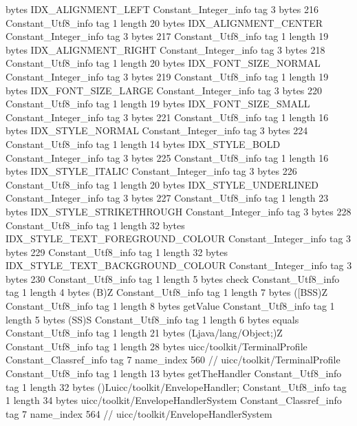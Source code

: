 {{{			bytes	IDX_ALIGNMENT_LEFT
		}
		Constant_Integer_info {
			tag	3
			bytes	216
		}
		Constant_Utf8_info {
			tag	1
			length	20
			bytes	IDX_ALIGNMENT_CENTER
		}
		Constant_Integer_info {
			tag	3
			bytes	217
		}
		Constant_Utf8_info {
			tag	1
			length	19
			bytes	IDX_ALIGNMENT_RIGHT
		}
		Constant_Integer_info {
			tag	3
			bytes	218
		}
		Constant_Utf8_info {
			tag	1
			length	20
			bytes	IDX_FONT_SIZE_NORMAL
		}
		Constant_Integer_info {
			tag	3
			bytes	219
		}
		Constant_Utf8_info {
			tag	1
			length	19
			bytes	IDX_FONT_SIZE_LARGE
		}
		Constant_Integer_info {
			tag	3
			bytes	220
		}
		Constant_Utf8_info {
			tag	1
			length	19
			bytes	IDX_FONT_SIZE_SMALL
		}
		Constant_Integer_info {
			tag	3
			bytes	221
		}
		Constant_Utf8_info {
			tag	1
			length	16
			bytes	IDX_STYLE_NORMAL
		}
		Constant_Integer_info {
			tag	3
			bytes	224
		}
		Constant_Utf8_info {
			tag	1
			length	14
			bytes	IDX_STYLE_BOLD
		}
		Constant_Integer_info {
			tag	3
			bytes	225
		}
		Constant_Utf8_info {
			tag	1
			length	16
			bytes	IDX_STYLE_ITALIC
		}
		Constant_Integer_info {
			tag	3
			bytes	226
		}
		Constant_Utf8_info {
			tag	1
			length	20
			bytes	IDX_STYLE_UNDERLINED
		}
		Constant_Integer_info {
			tag	3
			bytes	227
		}
		Constant_Utf8_info {
			tag	1
			length	23
			bytes	IDX_STYLE_STRIKETHROUGH
		}
		Constant_Integer_info {
			tag	3
			bytes	228
		}
		Constant_Utf8_info {
			tag	1
			length	32
			bytes	IDX_STYLE_TEXT_FOREGROUND_COLOUR
		}
		Constant_Integer_info {
			tag	3
			bytes	229
		}
		Constant_Utf8_info {
			tag	1
			length	32
			bytes	IDX_STYLE_TEXT_BACKGROUND_COLOUR
		}
		Constant_Integer_info {
			tag	3
			bytes	230
		}
		Constant_Utf8_info {
			tag	1
			length	5
			bytes	check
		}
		Constant_Utf8_info {
			tag	1
			length	4
			bytes	(B)Z
		}
		Constant_Utf8_info {
			tag	1
			length	7
			bytes	([BSS)Z
		}
		Constant_Utf8_info {
			tag	1
			length	8
			bytes	getValue
		}
		Constant_Utf8_info {
			tag	1
			length	5
			bytes	(SS)S
		}
		Constant_Utf8_info {
			tag	1
			length	6
			bytes	equals
		}
		Constant_Utf8_info {
			tag	1
			length	21
			bytes	(Ljava/lang/Object;)Z
		}
		Constant_Utf8_info {
			tag	1
			length	28
			bytes	uicc/toolkit/TerminalProfile
		}
		Constant_Classref_info {
			tag	7
			name_index	560		// uicc/toolkit/TerminalProfile
		}
		Constant_Utf8_info {
			tag	1
			length	13
			bytes	getTheHandler
		}
		Constant_Utf8_info {
			tag	1
			length	32
			bytes	()Luicc/toolkit/EnvelopeHandler;
		}
		Constant_Utf8_info {
			tag	1
			length	34
			bytes	uicc/toolkit/EnvelopeHandlerSystem
		}
		Constant_Classref_info {
			tag	7
			name_index	564		// uicc/toolkit/EnvelopeHandlerSystem
}}}
